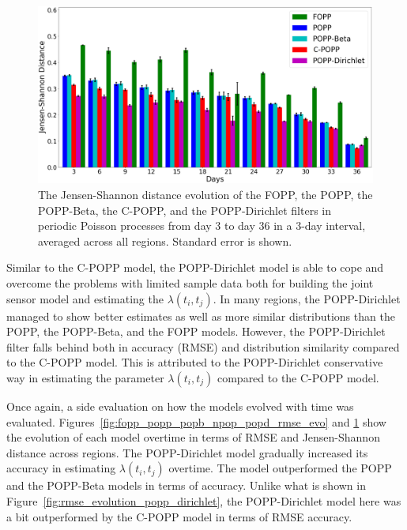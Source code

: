 \begin{figure}[t!]
	\centering
	\includegraphics[width=0.95\columnwidth]{./figures/fopp_popp_popb_npop_popd_kl_evo.png}
	\caption{The Jensen-Shannon distance evolution of the FOPP, the POPP, the POPP-Beta, the C-POPP, and the POPP-Dirichlet filters in periodic Poisson processes from day 3 to day 36 in a 3-day interval, averaged across all regions. Standard error is shown.}
	\label{fig:fopp_popp_popb_npop_popd_kl_evo}
\end{figure}

Similar to the C-POPP model, the POPP-Dirichlet model is able to cope and overcome the problems with limited sample data both for building the joint sensor model and estimating the $\lambda(t_i, t_j)$. In many regions, the POPP-Dirichlet managed to show better estimates as well as more similar distributions than the POPP, the POPP-Beta, and the FOPP models. However, the POPP-Dirichlet filter falls behind both in accuracy (RMSE) and distribution similarity compared to the C-POPP model. This is attributed to the POPP-Dirichlet conservative way in estimating the parameter $\lambda(t_i, t_j)$ compared to the C-POPP model.

Once again, a side evaluation on how the models evolved with time was evaluated. Figures~\ref{fig:fopp_popp_popb_npop_popd_rmse_evo} and \ref{fig:fopp_popp_popb_npop_popd_kl_evo} show the evolution of each model overtime in terms of RMSE and Jensen-Shannon distance across regions. The POPP-Dirichlet model gradually increased its accuracy in estimating $\lambda(t_i, t_j)$ overtime. The model outperformed the POPP and the POPP-Beta models in terms of accuracy. Unlike what is shown in Figure~\ref{fig:rmse_evolution_popp_dirichlet}, the POPP-Dirichlet model here was a bit outperformed by the C-POPP model in terms of RMSE accuracy.
